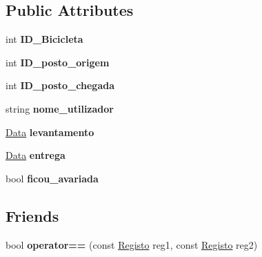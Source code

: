\subsection*{Public Attributes}
\begin{DoxyCompactItemize}
\item 
\hypertarget{class_registo_af745f6be9e0f119ff8285f2ad7bc0007}{int {\bfseries I\+D\+\_\+\+Bicicleta}}\label{class_registo_af745f6be9e0f119ff8285f2ad7bc0007}

\item 
\hypertarget{class_registo_ab1eceed0788883d77f331da0eed92876}{int {\bfseries I\+D\+\_\+posto\+\_\+origem}}\label{class_registo_ab1eceed0788883d77f331da0eed92876}

\item 
\hypertarget{class_registo_a95a2f4c5bbad742f0ccdfc0da873a2c2}{int {\bfseries I\+D\+\_\+posto\+\_\+chegada}}\label{class_registo_a95a2f4c5bbad742f0ccdfc0da873a2c2}

\item 
\hypertarget{class_registo_a58143db2825d4cc53f502001fa5d7659}{string {\bfseries nome\+\_\+utilizador}}\label{class_registo_a58143db2825d4cc53f502001fa5d7659}

\item 
\hypertarget{class_registo_ac0d3e2faff6e42050b6f75a3db8ae92b}{\hyperlink{class_data}{Data} {\bfseries levantamento}}\label{class_registo_ac0d3e2faff6e42050b6f75a3db8ae92b}

\item 
\hypertarget{class_registo_a051ce058418ededccbe9aae6900cd817}{\hyperlink{class_data}{Data} {\bfseries entrega}}\label{class_registo_a051ce058418ededccbe9aae6900cd817}

\item 
\hypertarget{class_registo_afa35faa61b95b63bbab972cfaca38b98}{bool {\bfseries ficou\+\_\+avariada}}\label{class_registo_afa35faa61b95b63bbab972cfaca38b98}

\end{DoxyCompactItemize}
\subsection*{Friends}
\begin{DoxyCompactItemize}
\item 
\hypertarget{class_registo_aaf8e089b26abe6bc63d1c2399433bce6}{bool {\bfseries operator==} (const \hyperlink{class_registo}{Registo} reg1, const \hyperlink{class_registo}{Registo} reg2)}\label{class_registo_aaf8e089b26abe6bc63d1c2399433bce6}

\end{DoxyCompactItemize}


